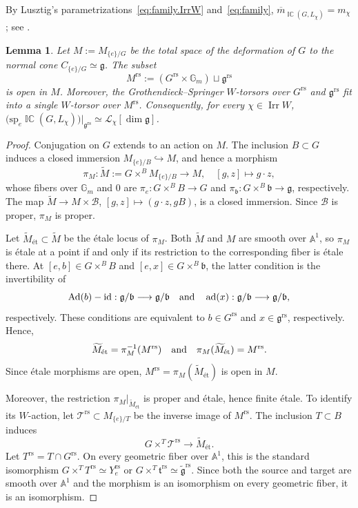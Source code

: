 \documentclass[11pt]{amsart}
\numberwithin{equation}{section}
\newtheorem{lemma}[theorem]{Lemma}
\theoremstyle{definition}
\newcommand\grs{\mathfrak{g}^{\mathrm{rs}}}
\newcommand\tgrs{\widetilde{\mathfrak{g}}^{\mathrm{rs}}}
\newcommand\rs{{\mathrm{rs}}}
\def\and{\quad{\rm and}\quad}
\def\lra{\longrightarrow }
\DeclareMathOperator{\Irr}{\mathrm{Irr}}
\DeclareMathOperator{\Ad}{\mathrm{Ad}}
\DeclareMathOperator{\ad}{\mathrm{ad}}
\def\sp{\mathrm{sp}}
\DeclareMathOperator{\id}{id}
\DeclareMathOperator{\ICperv}{\mathbb{IC}}
\def\cB{\mathcal {B}}
\def\A{\mathbb{A}}
\def\Gm{\mathbb{G}_m}
\def\fg{\mathfrak {g}}
\def\fb{\mathfrak {b}}
\def\ft{\mathfrak {t}}
\def\Grs{G^{\mathrm{rs}}}
\begin{document}
By Lusztig's parametrizations~\eqref{eq:family.IrrW} and~\eqref{eq:family}, $\overline m_{\ICperv(G,L_\chi)}=m_\chi$;
see \cite[Theorem~23.1(c)]{Lus86v}.


\begin{lemma}\label{lem:deform.rs}
Let $M:=M_{\{e\}/G}$ be the total space of the deformation of $G$ to the normal cone $C_{\{e\}/G}\simeq\fg$.
The subset
\[
M^{\mathrm{rs}}:=(\Grs\times\Gm)\sqcup\grs
\]
is open in $M$.
Moreover, the Grothendieck--Springer $W$-torsors over $\Grs$ and $\grs$ fit into a single $W$-torsor over $M^{\mathrm{rs}}$.
Consequently, for every $\chi\in\Irr W$, 
$\big(\sp_e\ICperv(G,L_\chi)\big)|_{\grs} \simeq \mathcal L_\chi[\dim\fg]$.

\end{lemma}

\begin{proof}
Conjugation on $G$ extends to an action on $M$.
The inclusion $B\subset G$ induces a closed immersion
$M_{\{e\}/B}\hookrightarrow M$, and hence a morphism
\[
\pi_M:\widetilde{M}:=G\times^B M_{\{e\}/B}\lra M,\quad[g,z]\mapsto g\cdot z,
\]
whose fibers over $\Gm$ and $0$ are $\pi_e:G\times^B B\to G$ and $\pi_\fb:G\times^B\fb\to\fg$, respectively.
The map $\widetilde M\to M\times\cB$, $[g,z]\mapsto(g\cdot z,gB)$, is a closed immersion.
Since $\cB$ is proper, $\pi_M$ is proper.

Let $\widetilde{M}_{\text{\'et}}\subset\widetilde{M}$ be the \'etale locus of $\pi_M$.
Both $\widetilde{M}$ and $M$ are smooth over $\A^1$, so $\pi_M$ is \'etale at a point if and only if its restriction to the corresponding fiber is \'etale there.
At $[e,b]\in G\times^B B$ and $[e,x]\in G\times^B\fb$, the latter condition is the invertibility of
\[
\Ad(b)-\id:\fg/\fb\lra\fg/\fb
\and
\ad(x):\fg/\fb\lra\fg/\fb,
\]
respectively.
These conditions are equivalent to $b\in\Grs$ and $x\in\grs$, respectively.
Hence,
\[\widetilde{M}_{\text{\'et}}=\pi_M^{-1}(M^\rs) \and \pi_M(\widetilde{M}_{\text{\'et}})=M^\rs.\]
Since \'etale morphisms are open, $M^{\mathrm{rs}}=\pi_M(\widetilde{M}_{\text{\'et}})$ is open in $M$.


Moreover, the restriction $\pi_M|_{\widetilde{M}_{\text{\'et}}}$ is proper and \'etale, hence finite \'etale.
To identify its $W$-action, let $\mathcal T^{\mathrm{rs}}\subset M_{\{e\}/T}$ be the inverse image of $M^{\mathrm{rs}}$.
The inclusion $T\subset B$ induces 
\[
G\times^T\mathcal T^{\mathrm{rs}}\lra {\widetilde{M}_{\text{\'et}}}.
\]
Let $T^{\mathrm{rs}}=T\cap G^{\mathrm{rs}}$.
On every geometric fiber over $\A^1$, this is the standard isomorphism $G\times^T T^{\mathrm{rs}}\simeq Y_e^{\mathrm{rs}}$ or $G\times^T\ft^{\mathrm{rs}}\simeq\tgrs$.
Since both the source and target are smooth over $\A^1$ and the morphism is an isomorphism on every geometric fiber, it is 
an isomorphism.


\end{proof}
\end{document}
